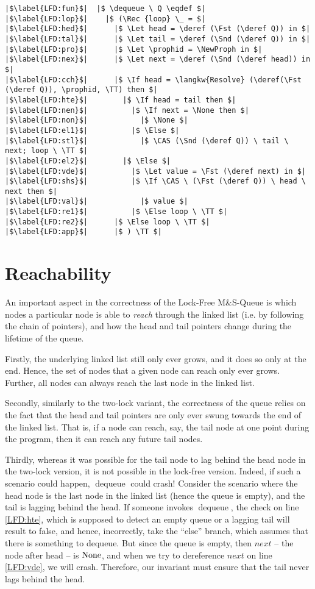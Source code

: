 \documentclass[a4paper, 10pt]{report}
\theoremstyle{definition}
\newcommand{\dequeue}{\operatorname{dequeue}}
\newcommand{\msq}{M\&S-Queue\xspace}
\newcommand{\lfmsq}{Lock-Free \msq}
\begin{document}
\begin{verbatim}
|$\label{LFD:fun}$|  |$ \dequeue \ Q \eqdef $|
|$\label{LFD:lop}$|    |$ (\Rec {loop} \_ = $|
|$\label{LFD:hed}$|      |$ \Let head = \deref (\Fst (\deref Q)) in $|
|$\label{LFD:tal}$|      |$ \Let tail = \deref (\Snd (\deref Q)) in $|
|$\label{LFD:pro}$|      |$ \Let \prophid = \NewProph in $|
|$\label{LFD:nex}$|      |$ \Let next = \deref (\Snd (\deref head)) in $|
|$\label{LFD:cch}$|      |$ \If head = \langkw{Resolve} (\deref(\Fst (\deref Q)), \prophid, \TT) then $|
|$\label{LFD:hte}$|        |$ \If head = tail then $|
|$\label{LFD:nen}$|          |$ \If next = \None then $|
|$\label{LFD:non}$|            |$ \None $|
|$\label{LFD:el1}$|          |$ \Else $|
|$\label{LFD:stl}$|            |$ \CAS (\Snd (\deref Q)) \ tail \ next; loop \ \TT $|
|$\label{LFD:el2}$|        |$ \Else $|
|$\label{LFD:vde}$|          |$ \Let value = \Fst (\deref next) in $|
|$\label{LFD:shs}$|          |$ \If \CAS \ (\Fst (\deref Q)) \ head \ next then $|
|$\label{LFD:val}$|            |$ value $|
|$\label{LFD:re1}$|          |$ \Else loop \ \TT $|
|$\label{LFD:re2}$|      |$ \Else loop \ \TT $|
|$\label{LFD:app}$|      |$ ) \TT $|
\end{verbatim}


\section{Reachability}
\label{LFMSQ:section:reachability}

An important aspect in the correctness of the \lfmsq is which nodes a particular node is able to \textit{reach} through the linked list (i.e. by following the chain of pointers), and how the head and tail pointers change during the lifetime of the queue.

Firstly, the underlying linked list still only ever grows, and it does so only at the end. Hence, the set of nodes that a given node can reach only ever grows. Further, all nodes can always reach the last node in the linked list.

Secondly, similarly to the two-lock variant, the correctness of the queue relies on the fact that the head and tail pointers are only ever swung towards the end of the linked list. That is, if a node can reach, say, the tail node at one point during the program, then it can reach any future tail nodes.

Thirdly, whereas it was possible for the tail node to lag behind the head node in the two-lock version, it is not possible in the lock-free version. Indeed, if such a scenario could happen, $\dequeue$ could crash! Consider the scenario where the head node is the last node in the linked list (hence the queue is empty), and the tail is lagging behind the head. If someone invokes $\dequeue$, the check on line \ref{LFD:hte}, which is supposed to detect an empty queue or a lagging tail will result to false, and hence, incorrectly, take the ``else'' branch, which assumes that there is something to dequeue. But since the queue is empty, then $next$ -- the node after head -- is $\operatorname{None}$, and when we try to dereference $next$ on line \ref{LFD:vde}, we will crash. Therefore, our invariant must ensure that the tail never lags behind the head.
\end{document}
